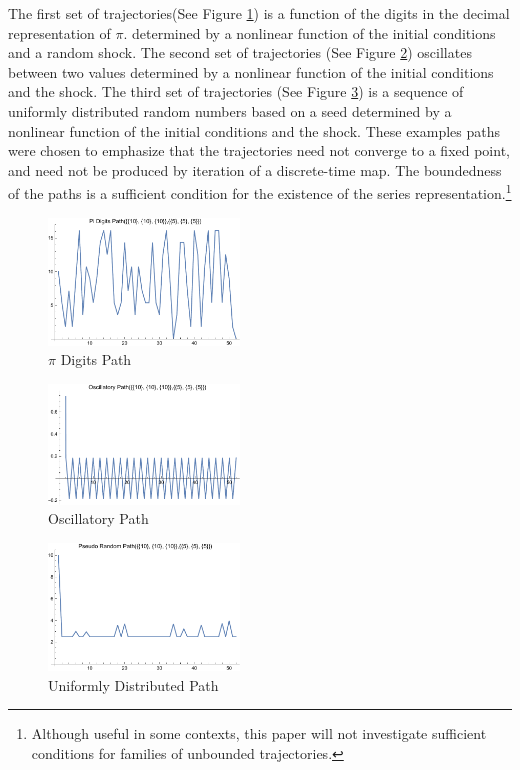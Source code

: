 \documentclass[12pt]{article}
\begin{document}
The first set of trajectories(See Figure \ref{pipath}) is a function of
the digits in the decimal representation of $\pi$.  
determined by a nonlinear function of the initial conditions and a random shock.
The second set of trajectories (See Figure \ref{oscillpath}) oscillates between two values
determined by  a nonlinear function of the initial conditions and the shock.
The third set of trajectories (See Figure \ref{pseudopath}) is a sequence of uniformly distributed random
numbers based on a seed determined by  a nonlinear function of  the initial conditions and the shock.
These examples paths were chosen to emphasize that the trajectories
 need not converge to a fixed point, and 
need not be produced by iteration of a discrete-time map.
The boundedness of the paths is a sufficient condition for the existence 
of the series representation.\footnote{Although useful in some contexts,
this paper will not investigate sufficient conditions for families of
unbounded trajectories.}


\begin{figure}
  \centering
\includegraphics[width=2in]{piPath.pdf}
  
  \caption{$\pi$ Digits Path}\label{pipath}
\end{figure}
\begin{figure}
  \centering
\includegraphics[width=2in]{oscillPath.pdf}
  
  \caption{Oscillatory Path}\label{oscillpath}
\end{figure}

\begin{figure}
  \centering
\includegraphics[width=2in]{pseudoPath.pdf}
  \caption{Uniformly Distributed Path}\label{pseudopath}
\end{figure}
\end{document}
